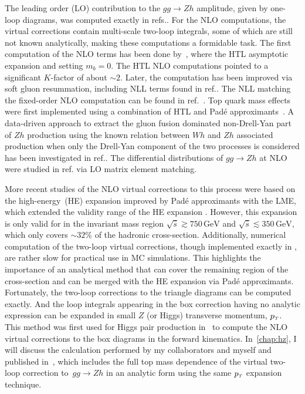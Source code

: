 \par  The leading order (LO) contribution to the $g g \rightarrow Z h$ amplitude, given by one-loop diagrams, was computed exactly in refs.\cite{Kniehl:1990iva, Dicus:1988yh}. For the NLO computations, the virtual corrections contain multi-scale two-loop integrals, some of which are still not known analytically, making these computations a formidable task. The first computation of the NLO terms has been done by~\cite{Altenkamp:2012sx}, where the HTL asymptotic expansion and setting $m_b = 0$. The HTL NLO computations pointed to a significant $K$-factor of about $\sim2$.  Later, the computation has been improved via soft gluon resummation, including NLL terms found in ref.\cite{Harlander:2014wda}. The NLL matching the fixed-order NLO computation can be found in ref.~\cite{Altenkamp:2012sx}.  Top quark mass effects were first implemented using a combination of  HTL  and Pad\'e approximants~\cite{Hasselhuhn:2016rqt}. A data-driven approach to extract the gluon fusion dominated non-Drell-Yan part of $Zh$ production using the known relation between  $Wh$
and $ Z h$ associated production when only the Drell-Yan component of the two processes is considered has been investigated in ref.\cite{Harlander:2018yns}. The differential distributions of $g g \rightarrow Zh$  at NLO were studied in ref.\cite{Hespel:2015zea} via LO matrix element matching. 
\par More recent studies of the NLO virtual corrections to this process were based on the high-energy~(HE) expansion improved by Pad\'e approximants with the LME, which extended the validity range of the HE expansion \cite{Davies:2020drs}. However, this expansion is only valid for in the invariant mass region $\sqrt{\hat{s}}  \gtrsim 750\, \si{\GeV} $ and $\sqrt{\hat{s}}  \lesssim 350\,  \si{\GeV}$,  which only covers $\sim 32\%$ of the hadronic cross-section. Additionally, numerical computation of the two-loop virtual corrections, though implemented exactly in  \cite{Chen:2020gae}, are rather slow for practical use in MC simulations.  This highlights the importance of an analytical method that can cover the remaining region of the cross-section and can be merged with the HE expansion via Pad\'e approximants. Fortunately, the two-loop corrections to the triangle diagrams can be computed exactly. And the loop integrals appearing in the box correction having no analytic expression can be expanded in small  $Z$ (or Higgs) 
transverse momentum, $p_{\scriptscriptstyle T}$. This method was first used for Higgs pair production in~\cite{Bonciani:2018omm} to compute the NLO virtual corrections to the box diagrams in the forward kinematics. In~\autoref{chap:hz}, I will discuss the calculation performed by my collaborators and myself and published in~\cite{Alasfar:2021ppe}, which includes the full top mass dependence of the virtual two-loop correction to~$ gg \to Zh$ in an analytic form using the same $p_{\scriptscriptstyle T}$ expansion technique.


